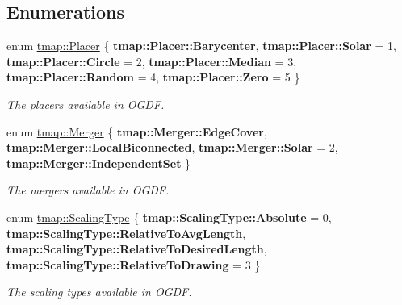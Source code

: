 \subsection*{Enumerations}
\begin{DoxyCompactItemize}
\item 
\mbox{\label{layout_8hh_afdc98947e81dc6f4c30f256e6f42f90b}} 
enum \hyperlink{layout_8hh_afdc98947e81dc6f4c30f256e6f42f90b}{tmap\+::\+Placer} \{ \newline
{\bfseries tmap\+::\+Placer\+::\+Barycenter}, 
{\bfseries tmap\+::\+Placer\+::\+Solar} = 1, 
{\bfseries tmap\+::\+Placer\+::\+Circle} = 2, 
{\bfseries tmap\+::\+Placer\+::\+Median} = 3, 
\newline
{\bfseries tmap\+::\+Placer\+::\+Random} = 4, 
{\bfseries tmap\+::\+Placer\+::\+Zero} = 5
 \}\begin{DoxyCompactList}\small\item\em The placers available in O\+G\+DF. \end{DoxyCompactList}
\item 
\mbox{\label{layout_8hh_a8c7bb9956a1a724233182a166cfdc0ff}} 
enum \hyperlink{layout_8hh_a8c7bb9956a1a724233182a166cfdc0ff}{tmap\+::\+Merger} \{ {\bfseries tmap\+::\+Merger\+::\+Edge\+Cover}, 
{\bfseries tmap\+::\+Merger\+::\+Local\+Biconnected}, 
{\bfseries tmap\+::\+Merger\+::\+Solar} = 2, 
{\bfseries tmap\+::\+Merger\+::\+Independent\+Set}
 \}\begin{DoxyCompactList}\small\item\em The mergers available in O\+G\+DF. \end{DoxyCompactList}
\item 
\mbox{\label{layout_8hh_a50ec215c9e54cf12b9dd0a0056160761}} 
enum \hyperlink{layout_8hh_a50ec215c9e54cf12b9dd0a0056160761}{tmap\+::\+Scaling\+Type} \{ {\bfseries tmap\+::\+Scaling\+Type\+::\+Absolute} = 0, 
{\bfseries tmap\+::\+Scaling\+Type\+::\+Relative\+To\+Avg\+Length}, 
{\bfseries tmap\+::\+Scaling\+Type\+::\+Relative\+To\+Desired\+Length}, 
{\bfseries tmap\+::\+Scaling\+Type\+::\+Relative\+To\+Drawing} = 3
 \}\begin{DoxyCompactList}\small\item\em The scaling types available in O\+G\+DF. \end{DoxyCompactList}
\end{DoxyCompactItemize}
